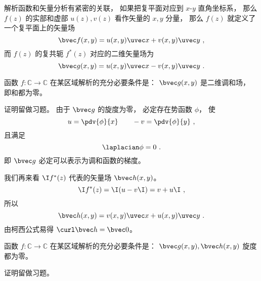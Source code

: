 

解析函数和矢量分析有紧密的关联， 如果把复平面对应到 $x$-$y$ 直角坐标系， 那么 $f(z)$ 的实部和虚部 $u(z), v(z)$ 看作矢量的 $x,y$ 分量， 那么 $f(z)$ 就定义了一个复平面上的矢量场
\begin{equation}
\bvec f(x,y) = u(x,y)\uvec x + v(x,y)\uvec y~,
\end{equation}
而 $f(z)$ 的复共轭 $f^*(z)$ 对应的二维矢量场为
\begin{equation}
\bvec g(x,y) = u(x,y)\uvec x - v(x,y)\uvec y~.
\end{equation}

\begin{theorem}{}
函数 $f:\mathbb C\to\mathbb C$ 在某区域解析的充分必要条件是： $\bvec g(x,y)$ 是二维调和场， 即和都为零。
\end{theorem}
证明留做习题。 由于 $\bvec g$ 的旋度为零， 必定存在势函数 $\phi$， 使
\begin{equation}
u = \pdv{\phi}{x} \qquad -v = \pdv{\phi}{y}~,
\end{equation}
且满足
\begin{equation}
\laplacian \phi = 0~.
\end{equation}
即 $\bvec g$ 必定可以表示为调和函数的梯度。

我们再来看 $\I f^*(z)$ 代表的矢量场 $\bvec h(x,y)$。
\begin{equation}
\I f^*(z) = \I (u - v\I) = v + u\I~,
\end{equation}
所以
\begin{equation}
\bvec h(x,y) = v(x,y)\uvec x + u(x,y)\uvec y~.
\end{equation}
由柯西公式易得 $\curl \bvec h = \bvec 0$。

\begin{theorem}{}
函数 $f:\mathbb C\to\mathbb C$ 在某区域解析的充分必要条件是： $\bvec g(x,y), \bvec h(x,y)$ 旋度都为零。
\end{theorem}
证明留做习题。
